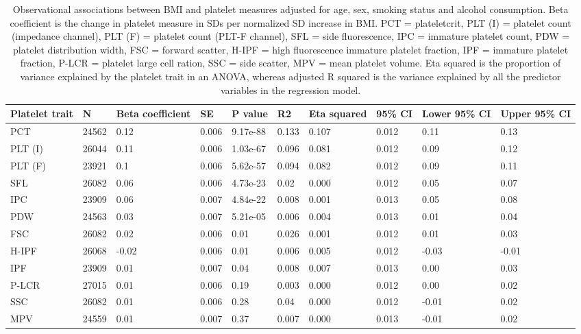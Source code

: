 \documentclass[11pt,twoside]{bristolthesis}
\begin{document}
\begin{landscape}\begin{table}

\caption[Observational associations between BMI and platelet measures adjusted for age, sex, smoking status and alcohol consumption]{\label{tab:BMI-platelets-adjust}Observational associations between BMI and platelet measures adjusted for age, sex, smoking status and alcohol consumption. Βeta coefficient is the change in platelet measure in SDs per normalized SD increase in BMI. PCT = plateletcrit, PLT (I) = platelet count (impedance channel), PLT (F) = platelet count (PLT-F channel), SFL = side fluorescence, IPC = immature platelet count, PDW = platelet distribution width, FSC = forward scatter, H-IPF = high fluorescence immature platelet fraction, IPF = immature platelet fraction, P-LCR = platelet large cell ration, SSC = side scatter, MPV = mean platelet volume. Eta squared is the proportion of variance explained by the platelet trait in an ANOVA, whereas adjusted R squared is the variance explained by all the predictor variables in the regression model.}
\centering
\begin{tabu} to 
\toprule
Platelet trait & N & Βeta coefficient & SE & P value & R2 & Eta squared & 95\% CI & Lower 95\% CI & Upper 95\% CI\\
\midrule
PCT & 24562 & 0.12 & 0.006 & 9.17e-88 & 0.133 & 0.107 & 0.012 & 0.11 & 0.13\\
PLT (I) & 26044 & 0.11 & 0.006 & 1.03e-67 & 0.096 & 0.081 & 0.012 & 0.09 & 0.12\\
PLT (F) & 23921 & 0.1 & 0.006 & 5.62e-57 & 0.094 & 0.082 & 0.012 & 0.09 & 0.11\\
SFL & 26082 & 0.06 & 0.006 & 4.73e-23 & 0.02 & 0.000 & 0.012 & 0.05 & 0.07\\
IPC & 23909 & 0.06 & 0.007 & 4.84e-22 & 0.008 & 0.001 & 0.013 & 0.05 & 0.08\\
\addlinespace
PDW & 24563 & 0.03 & 0.007 & 5.21e-05 & 0.006 & 0.004 & 0.013 & 0.01 & 0.04\\
FSC & 26082 & 0.02 & 0.006 & 0.01 & 0.026 & 0.001 & 0.012 & 0.01 & 0.03\\
H-IPF & 26068 & -0.02 & 0.006 & 0.01 & 0.006 & 0.005 & 0.012 & -0.03 & -0.01\\
IPF & 23909 & 0.01 & 0.007 & 0.04 & 0.008 & 0.007 & 0.013 & 0.00 & 0.03\\
P-LCR & 27015 & 0.01 & 0.006 & 0.19 & 0.003 & 0.000 & 0.012 & 0.00 & 0.02\\
\addlinespace
SSC & 26082 & 0.01 & 0.006 & 0.28 & 0.04 & 0.000 & 0.012 & -0.01 & 0.02\\
MPV & 24559 & 0.01 & 0.007 & 0.37 & 0.007 & 0.000 & 0.013 & -0.01 & 0.02\\
\bottomrule
\end{tabu}
\end{table}
\end{landscape}
\end{document}
